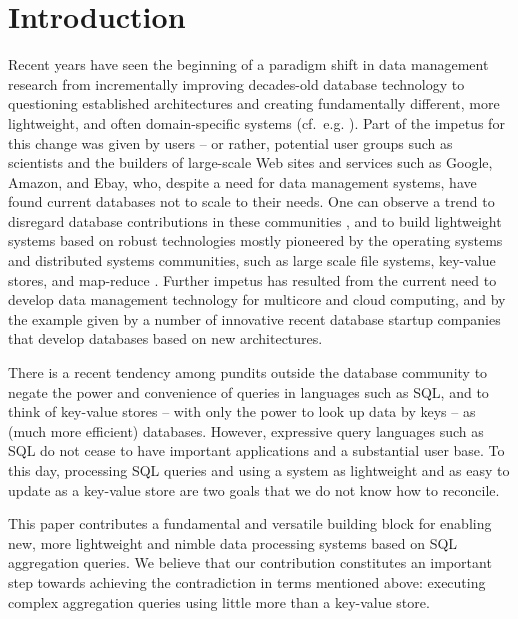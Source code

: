 \section{Introduction}


Recent years have seen the beginning of a paradigm shift in data management
research from incrementally
improving decades-old database technology
%
%
to questioning established
architectures and creating fundamentally different, more lightweight, and
often domain-specific systems (cf.\ e.g. \cite{DBLP:conf/vldb/StonebrakerMAHHH07,DBLP:journals/pvldb/KallmanKNPRZJMSZHA08}).
Part of the impetus for this change was given by users --
or rather, potential user groups such as scientists and the builders of
large-scale Web sites and services such as Google, Amazon, and Ebay,
who, despite a need for data management systems, have found current databases
not to scale to their needs.
One can observe a trend to disregard database contributions
in these communities \cite{dbcolumn, DBLP:conf/sigmod/PavloPRADMS09}, and to build lightweight systems based on
robust technologies mostly pioneered by the operating systems and distributed
systems communities, such as large scale file systems, key-value stores, and
map-reduce
\cite{DBLP:journals/cacm/DeanG08, DBLP:journals/tocs/ChangDGHWBCFG08}.
Further impetus has resulted from the current need to develop data management
technology for multicore and cloud computing, and by the example given by a
number of innovative recent database startup companies that develop
databases based on new architectures.
%

There is a recent tendency among pundits outside the database community to
negate the power and convenience of queries in languages such as SQL, and to
think of key-value stores -- with only the power to look up data by
keys -- as (much more efficient) databases.
%
%
However, expressive query languages such as SQL do not cease to have
important applications and a substantial user base.
To this day, processing SQL queries and using a system as lightweight and
as easy to update as a key-value store are two goals that we
do not know how to reconcile.

This paper contributes a fundamental and versatile building block for
enabling new, more lightweight and nimble data processing systems based
on SQL aggregation que\-ries. We believe that our contribution
constitutes an important
step towards achieving the contradiction in terms mentioned
above: executing complex aggregation queries using little more than a key-value
store.

